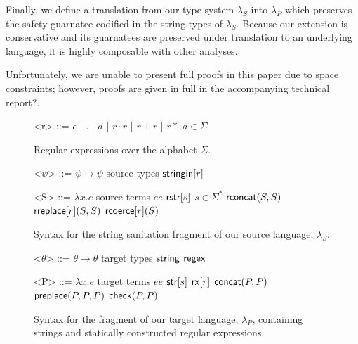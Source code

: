 \documentclass{acm_proc_article-sp}
\theoremstyle{definition}
\newcommand{\lambdas}{\lambda_S}
\newcommand{\lambdap}{\lambda_P}
\newcommand{\sisubst}[3]{{\sf rreplace}[#1](#2,#3)} \newcommand{\rreplace}[3]{{\sf rreplace}[#1](#2,#3)} %
\newcommand{\coerce}[2]{ {\sf rcoerce}[#1](#2)}
\newcommand{\sistr}[1]{{\sf rstr}[#1]}   \newcommand{\rstr}[1]{{\sf rstr}[#1]} %
\newcommand{\strin}[1]{\sistr{#1}}
\newcommand{\rsconcat}[2]{{\sf rconcat}(#1,#2)} \newcommand{\rconcat}[2]{{\sf rconcat}(#1,#2)} %
\newcommand{\stringin}[1]{{\sf stringin}[#1]}
\newcommand{\tcheck}[2]{{\sf check}(#1, #2)}
\renewcommand{\tstr}[1]{{{\sf str}[#1]}}
\newcommand{\preplace}[3]{{\sf preplace}(#1,#2,#3)}
\newcommand{\tconcat}[2]{{\sf concat}(#1,#2)} \newcommand{\concat}[2]{{\sf concat}(#1,#2)} %
\newcommand{\rx}[1]{ {\sf rx}[#1] }
\newcommand{\str}{{\sf string}}
\newcommand{\regex}{{\sf regex}}
\begin{document}
Finally, we define a translation from our type system $\lambdas$ into $\lambdap$ which preserves the safety guarnatee codified in the string types of $\lambdas$. Because our extension is conservative and its guarnatees are preserved under translation to an underlying language, it is highly composable with other analyses.

Unfortunately, we are unable to present full proofs in this paper due to space constraints; however, proofs are given in full in the accompanying technical report?.

\renewcommand{\grammarlabel}[2]{#1\hfill#2}

\begin{figure}[h]
\begin{grammar}
<r> ::= $\epsilon$ | $.$ | $a$ | $r \cdot r$ | $r + r$ | $r*$ \hfill $a \in \Sigma$

\caption{Regular expressions over the alphabet $\Sigma$.}
\end{grammar}
\end{figure}

\begin{figure}[h]
\begin{grammar}

<$\psi$> ::=	$\psi \rightarrow \psi$			\hfill	source types					\alt
$\stringin{r}$				 

<S> ::= 
      $\lambda x . e$ \hfill source terms \alt
      $e e$ \alt
      $\strin{s}$ \hfill $s \in \Sigma^{*}$ \alt
      $\rsconcat{S}{S}$ \alt
      $\sisubst{r}{S}{S}$ \alt
      $\coerce{r}{S}$
\caption{Syntax for the string sanitation fragment of our source language, $\lambdas$.}
\end{grammar}
\end{figure}

\begin{figure}[h]
\begin{grammar}

<$\theta$> ::= $\theta \rightarrow \theta$ \hfill target types \alt
$\str$ \alt $\regex$


<P> ::= $\lambda x . e$ \hfill target terms \alt
  $e e$ \alt
  $\tstr{s}$ \alt
  $\rx{r}$ \alt
  $\tconcat{P}{P}$ \alt
  $\preplace{P}{P}{P}$ \alt
  $\tcheck{P}{P}$ 
  \end{grammar}
\caption{Syntax for the fragment of our target language, $\lambdap$, containing strings and statically constructed regular expressions.}
\label{fig:lcsSyntax}
\end{figure}
\end{document}
